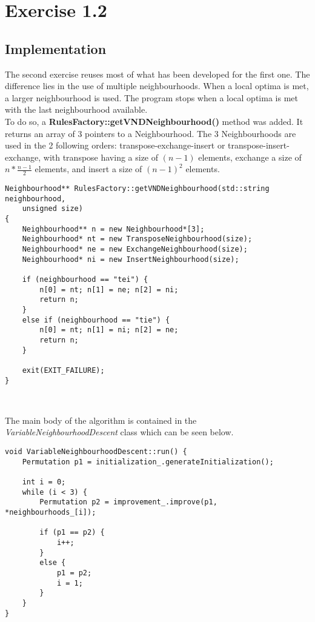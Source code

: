 \section{Exercise 1.2}

\subsection{Implementation}
The second exercise reuses most of what has been developed for the first one.
The difference lies in the use of multiple neighbourhoods. When a local optima
is met, a larger neighbourhood is used. The program stops when a local optima is
met with the last neighbourhood available.\\

To do so, a \textbf{RulesFactory::getVNDNeighbourhood()} method was added. It
returns an array of 3 pointers to a Neighbourhood. The 3 Neighbourhoods are used
in the 2 following orders: transpose-exchange-insert or transpose-insert-exchange,
with transpose having a size of $(n-1)$ elements, exchange a size of
$n * \frac{n-1}{2}$ elements, and insert a size of $(n-1)^2$ elements.\\

\begin{lstlisting}
Neighbourhood** RulesFactory::getVNDNeighbourhood(std::string neighbourhood,
    unsigned size)
{
    Neighbourhood** n = new Neighbourhood*[3];
    Neighbourhood* nt = new TransposeNeighbourhood(size);
    Neighbourhood* ne = new ExchangeNeighbourhood(size);
    Neighbourhood* ni = new InsertNeighbourhood(size);
    
    if (neighbourhood == "tei") {
        n[0] = nt; n[1] = ne; n[2] = ni;
        return n;
    }
    else if (neighbourhood == "tie") {
        n[0] = nt; n[1] = ni; n[2] = ne;
        return n;
    }
    
    exit(EXIT_FAILURE);
}
\end{lstlisting}
\

The main body of the algorithm is contained in the
\emph{VariableNeighbourhoodDescent} class which can be seen below.\\

\begin{lstlisting}
void VariableNeighbourhoodDescent::run() {
    Permutation p1 = initialization_.generateInitialization();
    
    int i = 0;
    while (i < 3) {
        Permutation p2 = improvement_.improve(p1, *neighbourhoods_[i]);
        
        if (p1 == p2) {
            i++;
        }
        else {
            p1 = p2;
            i = 1;
        }
    }
}
\end{lstlisting}

\newpage
